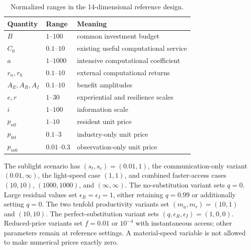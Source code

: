 \begin{table}[htbp]
\centering
\caption{Normalized ranges in the 14-dimensional reference design.}
\label{tab:ranges}
\begin{tabular}{@{}lll@{}}
\toprule
Quantity & Range & Meaning\\
\midrule
$B$ & $1$--$100$ & common investment budget\\
$C_0$ & $0.1$--$10$ & existing useful computational service\\
$a$ & $1$--$1000$ & intensive computational coefficient\\
$r_n,r_h$ & $0.1$--$10$ & external computational returns\\
$A_E,A_R,A_I$ & $0.1$--$10$ & benefit amplitudes\\
$e,r$ & $1$--$30$ & experiential and resilience scales\\
$i$ & $1$--$100$ & information scale\\
$p_{n0}$ & $1$--$10$ & resident unit price\\
$p_{h0}$ & $0.1$--$3$ & industry-only unit price\\
$p_{m0}$ & $0.01$--$0.3$ & observation-only unit price\\
\bottomrule
\end{tabular}
\end{table}

The sublight scenario has $(s_t,s_c)=(0.01,1)$, the communication-only variant $(0.01,\infty)$, the light-speed case $(1,1)$, and combined faster-access cases $(10,10)$, $(1000,1000)$, and $(\infty,\infty)$. The no-substitution variant sets $q=0$. Large residual values set $\epsilon_R=\epsilon_I=1$, either retaining $q=0.99$ or additionally setting $q=0$. The two tenfold productivity variants set $(m_a,m_r)=(10,1)$ and $(10,10)$. The perfect-substitution variant sets $(q,\epsilon_R,\epsilon_I)=(1,0,0)$. Reduced-price variants set $f=0.01$ or $10^{-4}$ with instantaneous access; other parameters remain at reference settings. A material-speed variable is not allowed to make numerical prices exactly zero.

\begin{table}[htbp]
\centering\small
\caption{All-inward inputs out of 1,024, with a conditional price-robustness check. The last column applies a uniform 10\% price reduction to each listed scenario while retaining its other settings. It is computed from the exact boundary, not from a new behavioral assumption or an observational sample.}
\label{tab:scenarios}

\end{table}

